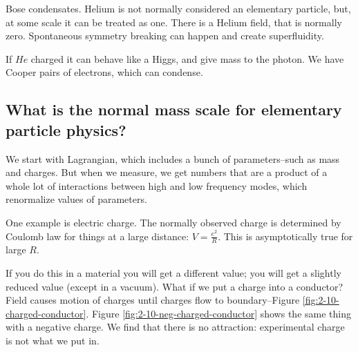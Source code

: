 \documentclass[]{article}
\begin{document}
Bose condensates. Helium is not normally considered an elementary particle, but, at some scale it can be treated as one. There is a Helium field, that is normally zero. Spontaneous symmetry breaking can happen and create superfluidity.

If $He$ charged it can behave like a Higgs, and give mass to the photon. We have Cooper pairs of electrons, which can condense.

\subsection{What is the normal mass scale for elementary particle physics?}

We start with Lagrangian, which includes a bunch of parameters--such as mass and charges. But when we measure, we get numbers that are a product of a whole lot of interactions between high and low frequency modes, which renormalize values of parameters.

One example is electric charge. The normally observed charge is determined by Coulomb law for things at a large distance: $V=\frac{e^2}{R}$. This is asymptotically true for large $R$.

If you do this in a material you will get a different value; you will get a slightly reduced value (except in a vacuum). What if we put a charge into a conductor? Field causes motion of charges until charges flow to boundary--Figure \ref{fig:2-10-charged-conductor}. Figure \ref{fig:2-10-neg-charged-conductor} shows the same thing with a negative charge. We find that there is no attraction: experimental charge is not what we put in.
\end{document}
